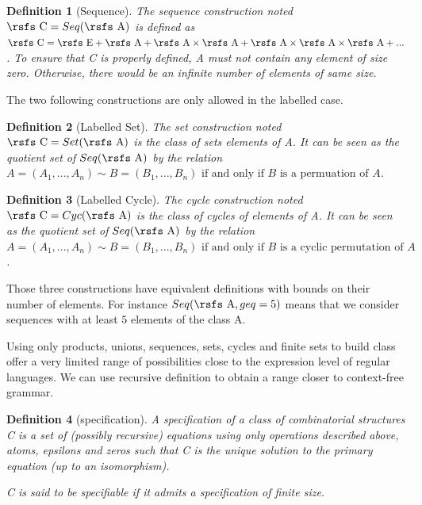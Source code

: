 \documentclass{article}
\newtheorem{definition}{Definition}
\begin{document}
\begin{definition}[Sequence]
The sequence construction noted $\text{\rsfs C} = Seq(\text{\rsfs A})$ is defined as $\text{\rsfs C} = \text{\rsfs E} + \text{\rsfs A} + \text{\rsfs A} \times \text{\rsfs A} + \text{\rsfs A} \times \text{\rsfs A} \times \text{\rsfs A} + ...$. To ensure that {\rsfs C} is properly defined, {\rsfs A} must not contain any element of size zero. Otherwise, there would be an infinite number of elements of same size.    
\end{definition}

The two following constructions are only allowed in the labelled case.

\begin{definition}[Labelled Set]
The set construction noted $\text{\rsfs C} = Set(\text{\rsfs A})$ is the class of sets elements of {\rsfs A}. It can be seen as the quotient set of $Seq(\text{\rsfs A})$ by the relation $A = (A_1, ..., A_n) \sim B = (B_1, ..., B_n)\text{ if and only if $B$ is a permuation of $A$}$.    
\end{definition}

\begin{definition}[Labelled Cycle]
The cycle construction noted $\text{\rsfs C} = Cyc(\text{\rsfs A})$ is the class of cycles of elements of {\rsfs A}. It can be seen as the quotient set of $Seq(\text{\rsfs A})$ by the relation $A = (A_1, ..., A_n) \sim B = (B_1, ..., B_n)\text{ if and only if $B$ is a cyclic permutation of $A$}$.    
\end{definition}

Those three constructions have equivalent definitions with bounds on their number of elements. For instance $Seq(\text{\rsfs A}, geq = 5)$ means that we consider sequences with at least $5$ elements of the class {\rsfs A}.

Using only products, unions, sequences, sets, cycles and finite sets to build class offer a very limited range of possibilities close to the expression level of regular languages. We can use recursive definition to obtain a range closer to context-free grammar.

\begin{definition}[specification]
A specification of a class of combinatorial structures {\rsfs C} is a set of (possibly recursive) equations using only operations described above, atoms, epsilons and zeros such that {\rsfs C} is the unique solution to the primary equation (up to an isomorphism).

{\rsfs C} is said to be specifiable if it admits a specification of finite size.
\end{definition}
\end{document}
